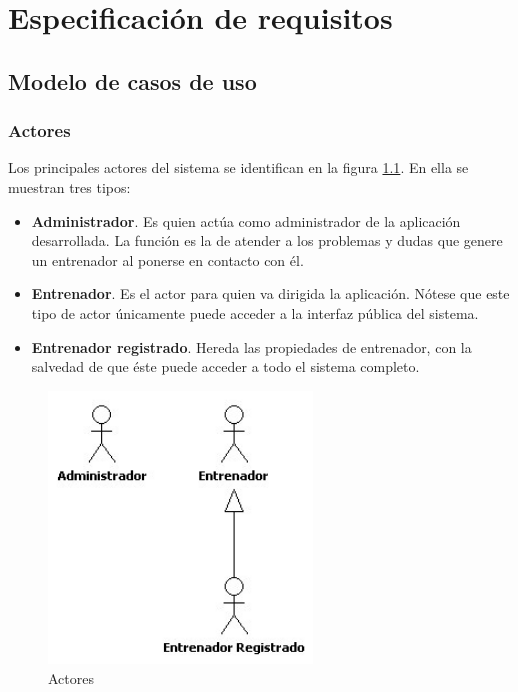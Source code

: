 %

\chapter{Especificación de requisitos} %
	\label{cha:especificacion_requisitos}
	
% 
%
\section{Modelo de casos de uso} %
	\label{sec:modelo_casos_de_uso}
	
	\subsection{Actores} %
		\label{sub:actores}
		
		Los principales actores del sistema se identifican en la figura \ref{fig:analisis_actores}. En ella se muestran tres tipos:
	
		\begin{itemize}
			\item {{\bf Administrador}. Es quien actúa como administrador de la aplicación desarrollada. La función es la de atender a los problemas y dudas que genere un entrenador al ponerse en contacto con él.}
			\item {{\bf Entrenador}. Es el actor para quien va dirigida la aplicación. Nótese que este tipo de actor únicamente puede acceder a la interfaz pública del sistema.}
			\item {{\bf Entrenador registrado}. Hereda las propiedades de entrenador, con la salvedad de que éste puede acceder a todo el sistema completo.}
		\end{itemize}
		
		\begin{figure}[H]
		  \centering
		    \includegraphics[width=7cm]{./eps/casos_uso/actores.eps}
		  \caption{Actores}
		  \label{fig:analisis_actores}
		\end{figure}
		
